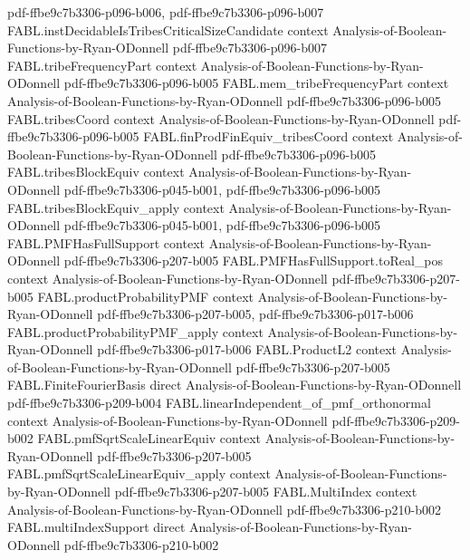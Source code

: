 \begin{theorem}
  {pdf-ffbe9c7b3306-p096-b006,
    pdf-ffbe9c7b3306-p096-b007}
\proofstep
  {FABL.instDecidableIsTribesCriticalSizeCandidate}
  {context}
  {Analysis-of-Boolean-Functions-by-Ryan-ODonnell}
  {pdf-ffbe9c7b3306-p096-b007}
\proofstep
  {FABL.tribeFrequencyPart}
  {context}
  {Analysis-of-Boolean-Functions-by-Ryan-ODonnell}
  {pdf-ffbe9c7b3306-p096-b005}
\proofstep
  {FABL.mem_tribeFrequencyPart}
  {context}
  {Analysis-of-Boolean-Functions-by-Ryan-ODonnell}
  {pdf-ffbe9c7b3306-p096-b005}
\proofstep
  {FABL.tribesCoord}
  {context}
  {Analysis-of-Boolean-Functions-by-Ryan-ODonnell}
  {pdf-ffbe9c7b3306-p096-b005}
\proofstep
  {FABL.finProdFinEquiv_tribesCoord}
  {context}
  {Analysis-of-Boolean-Functions-by-Ryan-ODonnell}
  {pdf-ffbe9c7b3306-p096-b005}
\proofstep
  {FABL.tribesBlockEquiv}
  {context}
  {Analysis-of-Boolean-Functions-by-Ryan-ODonnell}
  {pdf-ffbe9c7b3306-p045-b001,
    pdf-ffbe9c7b3306-p096-b005}
\proofstep
  {FABL.tribesBlockEquiv_apply}
  {context}
  {Analysis-of-Boolean-Functions-by-Ryan-ODonnell}
  {pdf-ffbe9c7b3306-p045-b001,
    pdf-ffbe9c7b3306-p096-b005}
\proofstep
  {FABL.PMFHasFullSupport}
  {context}
  {Analysis-of-Boolean-Functions-by-Ryan-ODonnell}
  {pdf-ffbe9c7b3306-p207-b005}
\proofstep
  {FABL.PMFHasFullSupport.toReal_pos}
  {context}
  {Analysis-of-Boolean-Functions-by-Ryan-ODonnell}
  {pdf-ffbe9c7b3306-p207-b005}
\proofstep
  {FABL.productProbabilityPMF}
  {context}
  {Analysis-of-Boolean-Functions-by-Ryan-ODonnell}
  {pdf-ffbe9c7b3306-p207-b005,
    pdf-ffbe9c7b3306-p017-b006}
\proofstep
  {FABL.productProbabilityPMF_apply}
  {context}
  {Analysis-of-Boolean-Functions-by-Ryan-ODonnell}
  {pdf-ffbe9c7b3306-p017-b006}
\proofstep
  {FABL.ProductL2}
  {context}
  {Analysis-of-Boolean-Functions-by-Ryan-ODonnell}
  {pdf-ffbe9c7b3306-p207-b005}
\proofstep
  {FABL.FiniteFourierBasis}
  {direct}
  {Analysis-of-Boolean-Functions-by-Ryan-ODonnell}
  {pdf-ffbe9c7b3306-p209-b004}
\proofstep
  {FABL.linearIndependent_of_pmf_orthonormal}
  {context}
  {Analysis-of-Boolean-Functions-by-Ryan-ODonnell}
  {pdf-ffbe9c7b3306-p209-b002}
\proofstep
  {FABL.pmfSqrtScaleLinearEquiv}
  {context}
  {Analysis-of-Boolean-Functions-by-Ryan-ODonnell}
  {pdf-ffbe9c7b3306-p207-b005}
\proofstep
  {FABL.pmfSqrtScaleLinearEquiv_apply}
  {context}
  {Analysis-of-Boolean-Functions-by-Ryan-ODonnell}
  {pdf-ffbe9c7b3306-p207-b005}
\proofstep
  {FABL.MultiIndex}
  {context}
  {Analysis-of-Boolean-Functions-by-Ryan-ODonnell}
  {pdf-ffbe9c7b3306-p210-b002}
\proofstep
  {FABL.multiIndexSupport}
  {direct}
  {Analysis-of-Boolean-Functions-by-Ryan-ODonnell}
  {pdf-ffbe9c7b3306-p210-b002}

\end{theorem}
